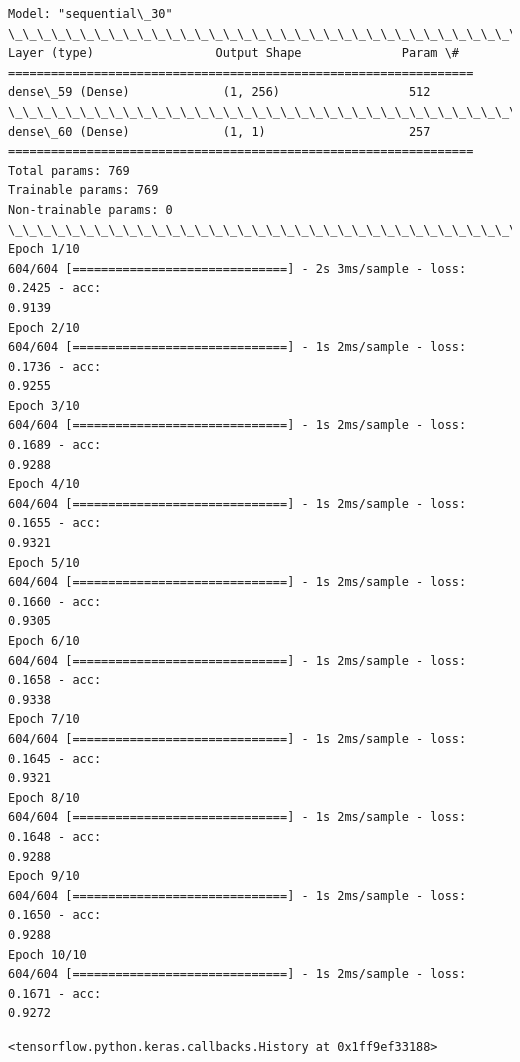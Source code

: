 \documentclass[11pt]{article}
\makeatletter
\newcommand{\boxspacing}{\kern\kvtcb@left@rule\kern\kvtcb@boxsep}
\newcommand{\prompt}[4]{
        \ttfamily\llap{{\color{#2}[#3]:\hspace{3pt}#4}}\vspace{-\baselineskip}
    }
\makeatother
\begin{document}
    \begin{Verbatim}[commandchars=\\\{\}]
Model: "sequential\_30"
\_\_\_\_\_\_\_\_\_\_\_\_\_\_\_\_\_\_\_\_\_\_\_\_\_\_\_\_\_\_\_\_\_\_\_\_\_\_\_\_\_\_\_\_\_\_\_\_\_\_\_\_\_\_\_\_\_\_\_\_\_\_\_\_\_
Layer (type)                 Output Shape              Param \#
=================================================================
dense\_59 (Dense)             (1, 256)                  512
\_\_\_\_\_\_\_\_\_\_\_\_\_\_\_\_\_\_\_\_\_\_\_\_\_\_\_\_\_\_\_\_\_\_\_\_\_\_\_\_\_\_\_\_\_\_\_\_\_\_\_\_\_\_\_\_\_\_\_\_\_\_\_\_\_
dense\_60 (Dense)             (1, 1)                    257
=================================================================
Total params: 769
Trainable params: 769
Non-trainable params: 0
\_\_\_\_\_\_\_\_\_\_\_\_\_\_\_\_\_\_\_\_\_\_\_\_\_\_\_\_\_\_\_\_\_\_\_\_\_\_\_\_\_\_\_\_\_\_\_\_\_\_\_\_\_\_\_\_\_\_\_\_\_\_\_\_\_
Epoch 1/10
604/604 [==============================] - 2s 3ms/sample - loss: 0.2425 - acc:
0.9139
Epoch 2/10
604/604 [==============================] - 1s 2ms/sample - loss: 0.1736 - acc:
0.9255
Epoch 3/10
604/604 [==============================] - 1s 2ms/sample - loss: 0.1689 - acc:
0.9288
Epoch 4/10
604/604 [==============================] - 1s 2ms/sample - loss: 0.1655 - acc:
0.9321
Epoch 5/10
604/604 [==============================] - 1s 2ms/sample - loss: 0.1660 - acc:
0.9305
Epoch 6/10
604/604 [==============================] - 1s 2ms/sample - loss: 0.1658 - acc:
0.9338
Epoch 7/10
604/604 [==============================] - 1s 2ms/sample - loss: 0.1645 - acc:
0.9321
Epoch 8/10
604/604 [==============================] - 1s 2ms/sample - loss: 0.1648 - acc:
0.9288
Epoch 9/10
604/604 [==============================] - 1s 2ms/sample - loss: 0.1650 - acc:
0.9288
Epoch 10/10
604/604 [==============================] - 1s 2ms/sample - loss: 0.1671 - acc:
0.9272
    \end{Verbatim}

            \begin{tcolorbox}[breakable, size=fbox, boxrule=.5pt, pad at break*=1mm, opacityfill=0]
\prompt{Out}{outcolor}{199}{\boxspacing}
\begin{Verbatim}[commandchars=\\\{\}]
<tensorflow.python.keras.callbacks.History at 0x1ff9ef33188>
\end{Verbatim}
\end{tcolorbox}
        
\end{document}
